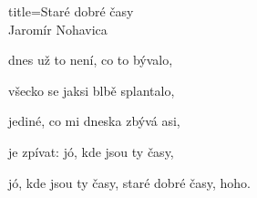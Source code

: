 \begin{song}{title=\predtitle \centering Staré dobré časy \\\large Jaromír Nohavica }
{\begin{centerjustified}
\begin{varwidth}[t]{0.48\textwidth}
dnes už to není, co to bývalo,

všecko se jaksi blbě splantalo,

jediné, co mi dneska zbývá asi,

je zpívat: jó, kde jsou ty časy,

jó, kde jsou ty časy, staré dobré časy,  hoho.

\end{varwidth}

\end{centerjustified}
}
\setcounter{Slokočet}{0}
\end{song}
